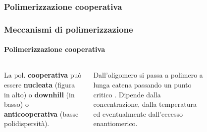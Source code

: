 \subsubsection{Polimerizzazione cooperativa}\begin{frame}\frametitle{Meccanismi di polimerizzazione}\framesubtitle{Polimerizzazione cooperativa}
\begin{columns}
La pol. \textbf{cooperativa} può essere \textbf{nucleata} (figura in alto) o \textbf{downhill} (in basso) o \textbf{anticooperativa} (basse polidispersità). 

Dall'oligomero si passa a polimero a lunga catena passando un punto critico
. Dipende dalla concentrazione, dalla temperatura ed eventualmente dall'eccesso enantiomerico.\vspace{-10pt}\begin{figure}{}\end{figure}
\end{columns}
 \begin{columns}

\end{columns}
\end{frame}
